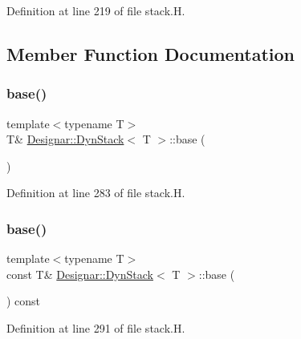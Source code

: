Definition at line 219 of file stack.\+H.



\subsection{Member Function Documentation}
\mbox{\label{class_designar_1_1_dyn_stack_aa07528cd0ef77519ca5b5694bed9695d}} 
\subsubsection{\texorpdfstring{base()}{base()}\hspace{0.1cm}{\footnotesize\ttfamily [1/2]}}
{\footnotesize\ttfamily template$<$typename T$>$ \\
T\& \hyperlink{class_designar_1_1_dyn_stack}{Designar\+::\+Dyn\+Stack}$<$ T $>$\+::base (\begin{DoxyParamCaption}{ }\end{DoxyParamCaption})\hspace{0.3cm}{\ttfamily [inline]}}



Definition at line 283 of file stack.\+H.

\mbox{\label{class_designar_1_1_dyn_stack_affe0e56802ac0c982f598e2155bf4a46}} 
\subsubsection{\texorpdfstring{base()}{base()}\hspace{0.1cm}{\footnotesize\ttfamily [2/2]}}
{\footnotesize\ttfamily template$<$typename T$>$ \\
const T\& \hyperlink{class_designar_1_1_dyn_stack}{Designar\+::\+Dyn\+Stack}$<$ T $>$\+::base (\begin{DoxyParamCaption}{ }\end{DoxyParamCaption}) const\hspace{0.3cm}{\ttfamily [inline]}}



Definition at line 291 of file stack.\+H.


